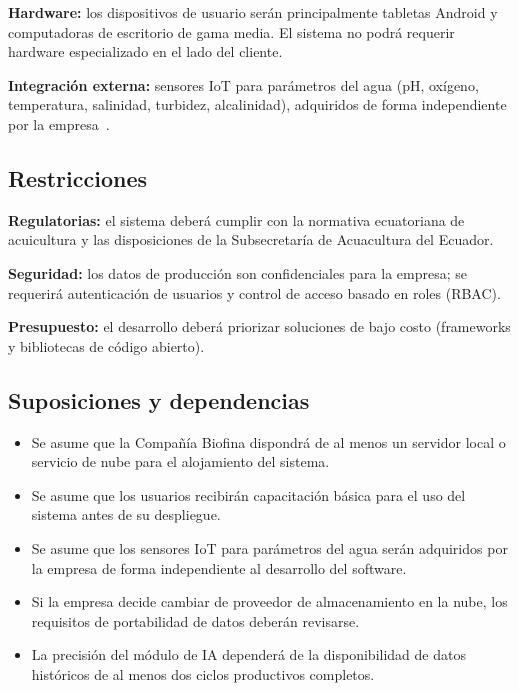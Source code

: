 \documentclass[11pt,a4paper]{article}
\begin{document}
\textbf{Hardware:} los dispositivos de usuario serán principalmente tabletas Android y computadoras de escritorio de gama media. El sistema no podrá requerir hardware especializado en el lado del cliente.

\textbf{Integración externa:} sensores IoT para parámetros del agua (pH, oxígeno, temperatura, salinidad, turbidez, alcalinidad), adquiridos de forma independiente por la empresa~\cite{water_quality_iot_2022}.

\subsection{Restricciones}

\textbf{Regulatorias:} el sistema deberá cumplir con la normativa ecuatoriana de acuicultura y las disposiciones de la Subsecretaría de Acuacultura del Ecuador.


\textbf{Seguridad:} los datos de producción son confidenciales para la empresa; se requerirá autenticación de usuarios y control de acceso basado en roles (RBAC).


\textbf{Presupuesto:} el desarrollo deberá priorizar soluciones de bajo costo (frameworks y bibliotecas de código abierto).

\subsection{Suposiciones y dependencias}
\begin{itemize}
    \item Se asume que la Compañía Biofina dispondrá de al menos un servidor local o servicio de nube para el alojamiento del sistema.
    
    \item Se asume que los usuarios recibirán capacitación básica para el uso del sistema antes de su despliegue.
    
    \item Se asume que los sensores IoT para parámetros del agua serán adquiridos por la empresa de forma independiente al desarrollo del software.
    
    \item Si la empresa decide cambiar de proveedor de almacenamiento en la nube, los requisitos de portabilidad de datos deberán revisarse.
    
    \item La precisión del módulo de IA dependerá de la disponibilidad de datos históricos de al menos dos ciclos productivos completos.
\end{itemize}
\end{document}
